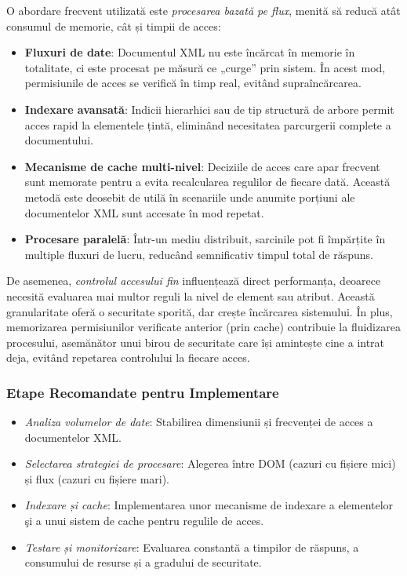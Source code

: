 \documentclass[runningheads]{llncs}
\begin{document}
O abordare frecvent utilizată este \textit{procesarea bazată pe flux}, menită să reducă atât consumul de memorie, cât și timpii de acces:

\begin{itemize}
   \item \textbf{Fluxuri de date}: Documentul XML nu este încărcat în memorie în totalitate, ci este procesat pe măsură ce „curge” prin sistem. În acest mod, permisiunile de acces se verifică în timp real, evitând supraîncărcarea.
   \item \textbf{Indexare avansată}: Indicii hierarhici sau de tip structură de arbore permit acces rapid la elementele țintă, eliminând necesitatea parcurgerii complete a documentului.
   \item \textbf{Mecanisme de cache multi-nivel}: Deciziile de acces care apar frecvent sunt memorate pentru a evita recalcularea regulilor de fiecare dată. Această metodă este deosebit de utilă în scenariile unde anumite porțiuni ale documentelor XML sunt accesate în mod repetat.
   \item \textbf{Procesare paralelă}: Într-un mediu distribuit, sarcinile pot fi împărțite în multiple fluxuri de lucru, reducând semnificativ timpul total de răspuns.
\end{itemize}

\noindent
De asemenea, \textit{controlul accesului fin} influențează direct performanța, deoarece necesită evaluarea mai multor reguli la nivel de element sau atribut. Această granularitate oferă o securitate sporită, dar crește încărcarea sistemului. În plus, memorizarea permisiunilor verificate anterior (prin cache) contribuie la fluidizarea procesului, asemănător unui birou de securitate care își amintește cine a intrat deja, evitând repetarea controlului la fiecare acces.

\subsubsection{Etape Recomandate pentru Implementare}

\begin{itemize}
   \item \textit{Analiza volumelor de date}: Stabilirea dimensiunii și frecvenței de acces a documentelor XML.
   \item \textit{Selectarea strategiei de procesare}: Alegerea între DOM (cazuri cu fișiere mici) și flux (cazuri cu fișiere mari).
   \item \textit{Indexare și cache}: Implementarea unor mecanisme de indexare a elementelor şi a unui sistem de cache pentru regulile de acces.
   \item \textit{Testare și monitorizare}: Evaluarea constantă a timpilor de răspuns, a consumului de resurse și a gradului de securitate.
\end{itemize}
\end{document}
